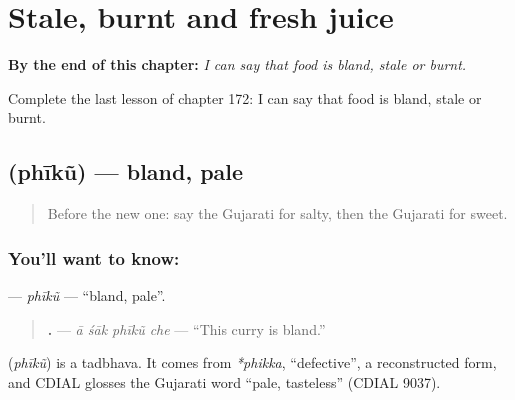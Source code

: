 
\chapter{Stale, burnt and fresh juice}
\label{ch:gu-stale-burnt-and-fresh-juice}

\begin{chapteropening}
\textbf{By the end of this chapter:} \emph{I can say that food is bland, stale or burnt.}

Complete the last lesson of chapter 172: I can say that food is bland, stale or burnt.
\end{chapteropening}

\section[\texorpdfstring{\gu{ફીકું} (phīkũ)}{ફીકું (phīkũ)}]{ (phīkũ) — bland, pale}

\label{lesson:GU-C172-phiku}



\begin{quote}
Before the new one: say the Gujarati for salty, then the Gujarati for sweet.
\end{quote}

\subsection*{You'll want to know: }
\textbf{} — \emph{phīkũ} — \textquotedblleft{}bland, pale\textquotedblright{}.

\begin{quote}
\textbf{   .} — \emph{ā śāk phīkũ che} — \textquotedblleft{}This curry is bland.\textquotedblright{}
\end{quote}

\begin{cousinweb}
\textbf{} (\emph{phīkũ}) is a tadbhava. It comes from \emph{*phikka}, \textquotedblleft{}defective\textquotedblright{}, a reconstructed form, and CDIAL glosses the Gujarati word \textquotedblleft{}pale, tasteless\textquotedblright{} (CDIAL 9037).
\end{cousinweb}

